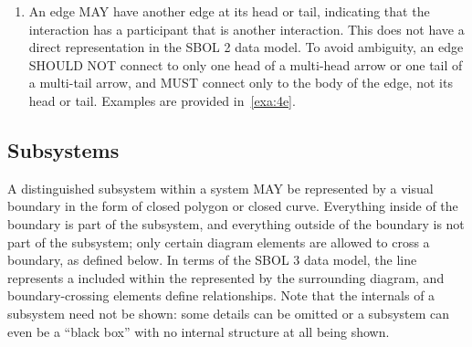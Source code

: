 \begin{enumerate}
\item An edge MAY have another edge at its head or tail, indicating that the interaction has a participant that is another interaction.
	This does not have a direct representation in the SBOL 2 data model. %
	To avoid ambiguity, an edge SHOULD NOT connect to only one head of a multi-head arrow or one tail of a multi-tail arrow, and MUST connect only to the body of the edge, not its head or tail.
	Examples are provided in~\ref{exa:4e}.

\end{enumerate}

\subsection{Subsystems}

A distinguished subsystem within a system MAY be represented by a visual boundary in the form of closed polygon or closed curve.
Everything inside of the boundary is part of the subsystem, and everything outside of the boundary is not part of the subsystem; only certain diagram elements are allowed to cross a boundary, as defined below.
In terms of the SBOL 3 data model, the line represents a  included within the  represented by the surrounding diagram, and boundary-crossing elements define  relationships.
Note that the internals of a subsystem need not be shown: some details can be omitted or a subsystem can even be a ``black box'' with no internal structure at all being shown.

